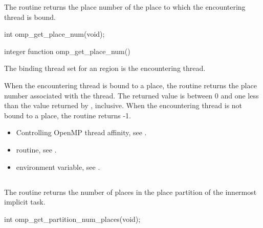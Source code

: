 \summary
The  routine returns the place number of the place to which the encountering thread is bound.

\format
\ccppspecificstart
\begin{boxedcode}
int omp\_get\_place\_num(void);
\end{boxedcode}
\ccppspecificend

\fortranspecificstart
\begin{boxedcode}
integer function omp\_get\_place\_num()
\end{boxedcode}
\fortranspecificend

\binding
The binding thread set for an  region is the encountering thread.

\effect
When the encountering thread is bound to a place, the 
 routine returns the place number associated 
with the thread. The returned value is between 0 and one less than the 
value returned by , inclusive. When the 
encountering thread is not bound to a place, the routine returns -1.

\crossreferences
\begin{itemize}
\item Controlling OpenMP thread affinity, see 
. 

\item {} routine, see 
.

\item {} environment variable, see 
.
\end{itemize}





\subsection{}
\label{subsec:omp_get_partition_num_places}

\summary
The  routine returns the number of places in the place partition of the innermost implicit task.

\format
\ccppspecificstart
\begin{boxedcode}
int omp\_get\_partition\_num\_places(void);
\end{boxedcode}
\ccppspecificend

